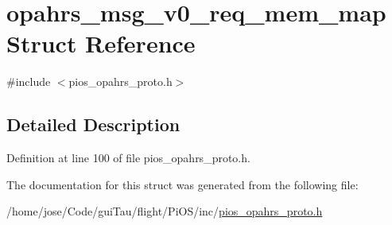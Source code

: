 \hypertarget{structopahrs__msg__v0__req__mem__map}{\section{opahrs\-\_\-msg\-\_\-v0\-\_\-req\-\_\-mem\-\_\-map Struct Reference}
\label{structopahrs__msg__v0__req__mem__map}
}


{\ttfamily \#include $<$pios\-\_\-opahrs\-\_\-proto.\-h$>$}



\subsection{Detailed Description}


Definition at line 100 of file pios\-\_\-opahrs\-\_\-proto.\-h.



The documentation for this struct was generated from the following file\-:\begin{DoxyCompactItemize}
\item 
/home/jose/\-Code/gui\-Tau/flight/\-Pi\-O\-S/inc/\hyperlink{pios__opahrs__proto_8h}{pios\-\_\-opahrs\-\_\-proto.\-h}\end{DoxyCompactItemize}
